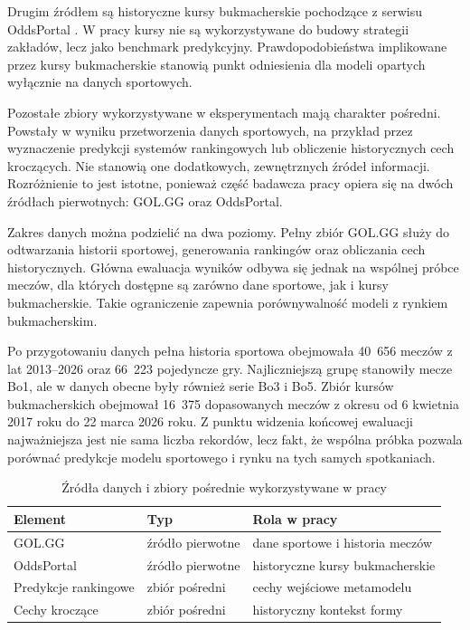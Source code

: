 Drugim źródłem są historyczne kursy bukmacherskie pochodzące z serwisu OddsPortal \parencite{oddsportal}. W pracy kursy nie są wykorzystywane do budowy strategii zakładów, lecz jako benchmark predykcyjny. Prawdopodobieństwa implikowane przez kursy bukmacherskie stanowią punkt odniesienia dla modeli opartych wyłącznie na danych sportowych.

Pozostałe zbiory wykorzystywane w eksperymentach mają charakter pośredni. Powstały w wyniku przetworzenia danych sportowych, na przykład przez wyznaczenie predykcji systemów rankingowych lub obliczenie historycznych cech kroczących. Nie stanowią one dodatkowych, zewnętrznych źródeł informacji. Rozróżnienie to jest istotne, ponieważ część badawcza pracy opiera się na dwóch źródłach pierwotnych: GOL.GG oraz OddsPortal.

Zakres danych można podzielić na dwa poziomy. Pełny zbiór GOL.GG służy do odtwarzania historii sportowej, generowania rankingów oraz obliczania cech historycznych. Główna ewaluacja wyników odbywa się jednak na wspólnej próbce meczów, dla których dostępne są zarówno dane sportowe, jak i kursy bukmacherskie. Takie ograniczenie zapewnia porównywalność modeli z rynkiem bukmacherskim.

Po przygotowaniu danych pełna historia sportowa obejmowała 40~656 meczów z lat 2013--2026 oraz 66~223 pojedyncze gry. Najliczniejszą grupę stanowiły mecze Bo1, ale w danych obecne były również serie Bo3 i Bo5. Zbiór kursów bukmacherskich obejmował 16~375 dopasowanych meczów z okresu od 6 kwietnia 2017 roku do 22 marca 2026 roku. Z punktu widzenia końcowej ewaluacji najważniejsza jest nie sama liczba rekordów, lecz fakt, że wspólna próbka pozwala porównać predykcje modelu sportowego i rynku na tych samych spotkaniach.

\begin{table}[H]
    \centering
    \caption{Źródła danych i zbiory pośrednie wykorzystywane w pracy}
    \label{tab:data_sources_role}
    \begin{tabular}{lll}
        \toprule
        Element & Typ & Rola w pracy \\
        \midrule
        GOL.GG & źródło pierwotne & dane sportowe i historia meczów \\
        OddsPortal & źródło pierwotne & historyczne kursy bukmacherskie \\
        Predykcje rankingowe & zbiór pośredni & cechy wejściowe metamodelu \\
        Cechy kroczące & zbiór pośredni & historyczny kontekst formy \\
        \bottomrule
    \end{tabular}
\end{table}

